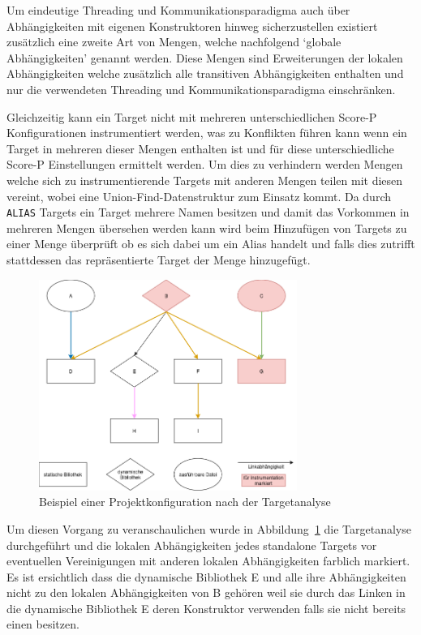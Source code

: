 \documentclass[german,proseminar,hyperref,utf8,lof]{zihpub}
\begin{document}
    Um eindeutige Threading und Kommunikationsparadigma auch über Abhängigkeiten mit eigenen
    Konstruktoren hinweg sicherzustellen existiert zusätzlich eine zweite Art von Mengen, welche
    nachfolgend `globale Abhängigkeiten' genannt werden.
    Diese Mengen sind Erweiterungen der lokalen Abhängigkeiten welche zusätzlich alle transitiven
    Abhängigkeiten enthalten und nur die verwendeten Threading und Kommunikationsparadigma einschränken.

    Gleichzeitig kann ein Target nicht mit mehreren unterschiedlichen Score-P Konfigurationen
    instrumentiert werden, was zu Konflikten führen kann wenn ein Target in mehreren dieser
    Mengen enthalten ist und für diese unterschiedliche Score-P Einstellungen ermittelt werden.
    Um dies zu verhindern werden Mengen welche sich zu instrumentierende Targets mit anderen
    Mengen teilen mit diesen vereint, wobei eine Union-Find-Datenstruktur zum Einsatz kommt.
    Da durch \texttt{ALIAS} Targets ein Target mehrere Namen besitzen und damit das Vorkommen
    in mehreren Mengen übersehen werden kann wird beim Hinzufügen von Targets zu einer Menge überprüft
    ob es sich dabei um ein Alias handelt und falls dies zutrifft stattdessen das repräsentierte Target
    der Menge hinzugefügt.

    \begin{figure}
        \begin{center}
            \includegraphics[width=0.75\textwidth]{analysis_localsets.drawio.png}
            \caption{Beispiel einer Projektkonfiguration nach der Targetanalyse}
            \label{fig:analysis_localsets}
        \end{center}
    \end{figure}

    Um diesen Vorgang zu veranschaulichen wurde in Abbildung~\ref{fig:analysis_localsets} die
    Targetanalyse durchgeführt und die lokalen Abhängigkeiten jedes standalone Targets vor eventuellen
    Vereinigungen mit anderen lokalen Abhängigkeiten farblich markiert.
    Es ist ersichtlich dass die dynamische Bibliothek E und alle ihre Abhängigkeiten nicht zu den
    lokalen Abhängigkeiten von B gehören weil sie durch das Linken in die dynamische Bibliothek E
    deren Konstruktor verwenden falls sie nicht bereits einen besitzen.
\end{document}
